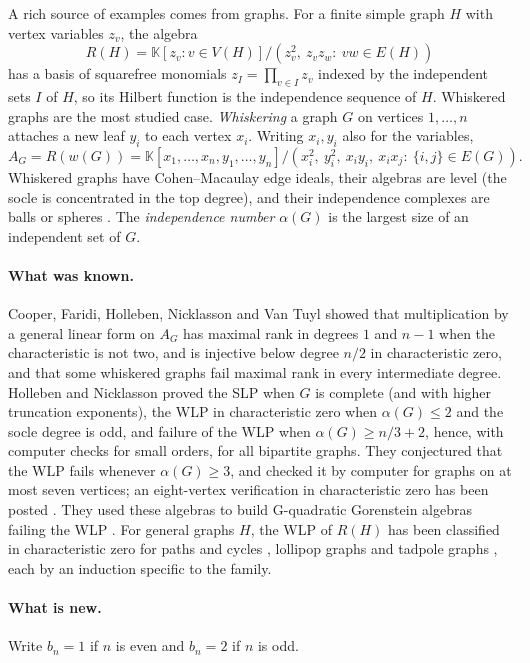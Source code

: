 \documentclass[11pt,a4paper]{article}
\theoremstyle{definition}
\newcommand{\kk}{\mathbb K}
\begin{document}
A rich source of examples comes from graphs. For a finite simple graph $H$ with vertex variables $z_v$, the algebra
\[
 R(H)=\kk[z_v:v\in V(H)]/(z_v^2,\ z_vz_w:\ vw\in E(H))
\]
has a basis of squarefree monomials $z_I=\prod_{v\in I}z_v$ indexed by the independent sets $I$ of $H$, so its Hilbert function is the independence sequence of $H$. Whiskered graphs are the most studied case. \emph{Whiskering} a graph $G$ on vertices $1,\dots,n$ attaches a new leaf $y_i$ to each vertex $x_i$. Writing $x_i,y_i$ also for the variables,
\begin{equation}\label{AG}
 A_G=R(w(G))=\kk[x_1,\dots,x_n,y_1,\dots,y_n]/(x_i^2,\ y_i^2,\ x_iy_i,\ x_ix_j:\ \{i,j\}\in E(G)).
\end{equation}
Whiskered graphs have Cohen--Macaulay edge ideals, their algebras are level (the socle is concentrated in the top degree), and their independence complexes are balls or spheres \cite{HN,Cooper}. The \emph{independence number} $\alpha(G)$ is the largest size of an independent set of $G$.

\paragraph{What was known.}
Cooper, Faridi, Holleben, Nicklasson and Van Tuyl \cite{Cooper} showed that multiplication by a general linear form on $A_G$ has maximal rank in degrees $1$ and $n-1$ when the characteristic is not two, and is injective below degree $n/2$ in characteristic zero, and that some whiskered graphs fail maximal rank in every intermediate degree. Holleben and Nicklasson \cite{HN} proved the SLP when $G$ is complete (and with higher truncation exponents), the WLP in characteristic zero when $\alpha(G)\le2$ and the socle degree is odd, and failure of the WLP when $\alpha(G)\ge n/3+2$, hence, with computer checks for small orders, for all bipartite graphs. They conjectured \cite[Conjecture~1.3 and Conjecture~3.15]{HN} that the WLP fails whenever $\alpha(G)\ge3$, and checked it by computer for graphs on at most seven vertices; an eight-vertex verification in characteristic zero has been posted \cite{Zeng}. They used these algebras to build G-quadratic Gorenstein algebras failing the WLP \cite[Theorem~4.6]{HN}. For general graphs $H$, the WLP of $R(H)$ has been classified in characteristic zero for paths and cycles \cite{NT}, lollipop graphs \cite{TPS} and tadpole graphs \cite{TPS2}, each by an induction specific to the family.

\paragraph{What is new.}
Write $b_n=1$ if $n$ is even and $b_n=2$ if $n$ is odd.
\end{document}
